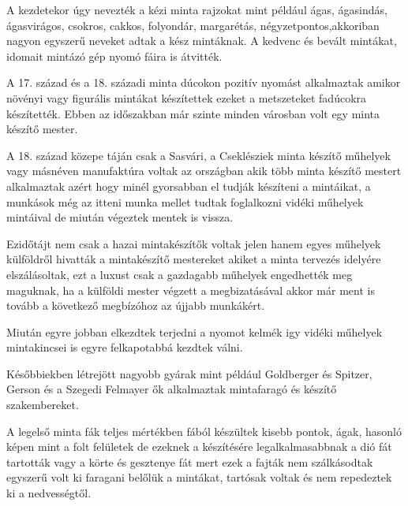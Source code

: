 \documentclass[fontsize=12pt, appendixprefix=true]{scrreprt}
\begin{document}


A kezdetekor úgy nevezték a kézi minta rajzokat mint például ágas, ágasindás, ágasvirágos, csokros, cakkos, folyondár, margarétás, négyzetpontos,akkoriban nagyon egyszerű neveket adtak a kész mintáknak. A kedvenc és bevált mintákat, idomait mintázó gép nyomó fáira is átvitték.

A 17. század és a 18. századi minta dúcokon pozitív nyomást alkalmaztak amikor növényi vagy figurális mintákat készítettek ezeket a metszeteket fadúcokra készítették. Ebben az időszakban már szinte minden városban volt egy minta készítő mester.

A 18. század közepe táján csak a Sasvári, a Cseklésziek minta készítő műhelyek vagy másnéven manufaktúra voltak az országban akik több minta készítő mestert alkalmaztak azért hogy minél gyorsabban el tudják készíteni a mintáikat, a munkások még az itteni munka mellet tudtak foglalkozni vidéki műhelyek mintáival de miután végeztek mentek is vissza. 

Ezidőtájt nem csak a hazai mintakészítők voltak jelen hanem egyes műhelyek külföldről hivatták a mintakészítő mestereket akiket a minta tervezés idelyére elszálásoltak, ezt a luxust csak a gazdagabb műhelyek engedhették meg maguknak, ha a külföldi mester végzett a megbizatásával akkor már ment is tovább a következő megbízóhoz az újjabb munkákért.

Miután egyre jobban elkezdtek terjedni a nyomot kelmék igy vidéki műhelyek mintakincsei is egyre felkapotabbá kezdtek válni.

Későbbiekben létrejött nagyobb gyárak mint például Goldberger és Spitzer, Gerson és a Szegedi Felmayer ők alkalmaztak mintafaragó és készítő szakembereket.

A legelső minta fák teljes mértékben fából készültek kisebb pontok, ágak, hasonló képen mint a folt felületek de ezeknek a készítésére legalkalmasabbnak a dió fát tartották vagy a körte és gesztenye fát mert ezek a fajták nem szálkásodtak egyszerű volt ki faragani belőlük a mintákat, tartósak voltak és nem repedeztek ki a nedvességtől.
\end{document}
